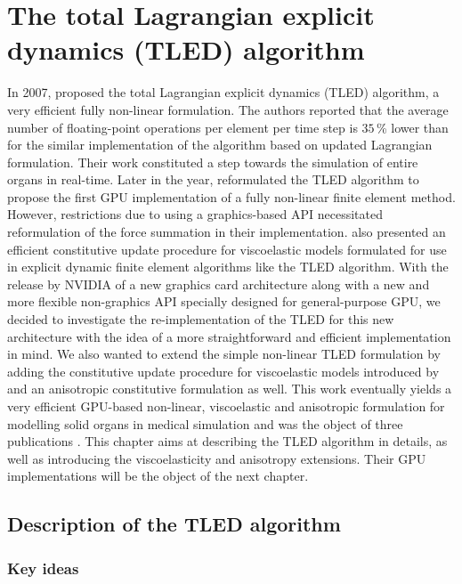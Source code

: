\chapter{The total Lagrangian explicit dynamics (TLED) algorithm}
\label{chap5}
\begin{shortAbstract}
In 2007, \citeauthor{Miller07} proposed the total Lagrangian explicit dynamics (TLED) algorithm, a very efficient fully non-linear formulation. The authors reported that the average number of floating-point operations per element per time step is $35\, $\% lower than for the similar implementation of the algorithm based on updated Lagrangian formulation. Their work constituted a step towards the simulation of entire organs in real-time. Later in the year, \citeauthor{Taylor07b} reformulated the TLED algorithm to propose the first GPU implementation of a fully non-linear finite element method. However, restrictions due to using a graphics-based API necessitated reformulation of the force summation in their implementation. \cite{Taylor07a} also presented an efficient constitutive update procedure for viscoelastic models formulated for use in explicit dynamic finite element algorithms like the TLED algorithm. With the release by NVIDIA of a new graphics card architecture along with a new and more flexible non-graphics API specially designed for general-purpose GPU, we decided to investigate the re-implementation of the TLED for this new architecture with the idea of a more straightforward and efficient implementation in mind. We also wanted to extend the simple non-linear TLED formulation by adding the constitutive update procedure for viscoelastic models introduced by \citeauthor{Taylor07a} and an anisotropic constitutive formulation as well. This work eventually yields a very efficient GPU-based non-linear, viscoelastic and anisotropic formulation for modelling solid organs in medical simulation and was the object of three publications \citep{Comas2008,Taylor2008,Taylor2009}. This chapter aims at describing the TLED algorithm in details, as well as introducing the viscoelasticity and anisotropy extensions. Their GPU implementations will be the object of the next chapter. 
\end{shortAbstract}


\section{Description of the TLED algorithm}

	\subsection{Key ideas}

